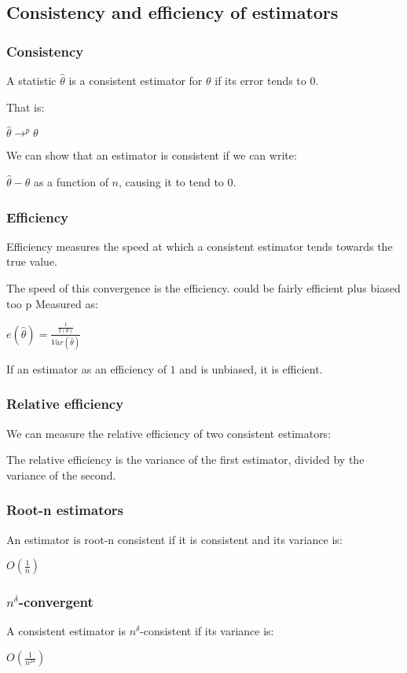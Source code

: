 
\subsection{Consistency and efficiency of estimators}

\subsubsection{Consistency}

A statistic \(\hat \theta \) is a consistent estimator for \(\theta \) if its error tends to \(0\).

That is:

\(\hat \theta\rightarrow^p \theta \)

We can show that an estimator is consistent if we can write:

\(\hat \theta -\theta \) as a function of \(n\), causing it to tend to \(0\).

\subsubsection{Efficiency}

Efficiency measures the speed at which a consistent estimator tends towards the true value.

The speed of this convergence is the efficiency. could be fairly efficient plus biased too	p Measured as:

\(e(\hat \theta )=\frac{\frac{1}{I(\theta )}}{Var (\hat \theta )}\)

If an estimator as an efficiency of \(1\) and is unbiased, it is efficient.

\subsubsection{Relative efficiency}

We can measure the relative efficiency of two consistent estimators:

The relative efficiency is the variance of the first estimator, divided by the variance of the second.

\subsubsection{Root-n estimators}

An estimator is root-n consistent if it is consistent and its variance is:

\(O(\frac{1}{n})\)

\subsubsection{\(n^\delta \)-convergent}

A consistent estimator is \(n^\delta \)-consistent if its variance is:

\(O(\frac{1}{n^{2 \delta }})\)

